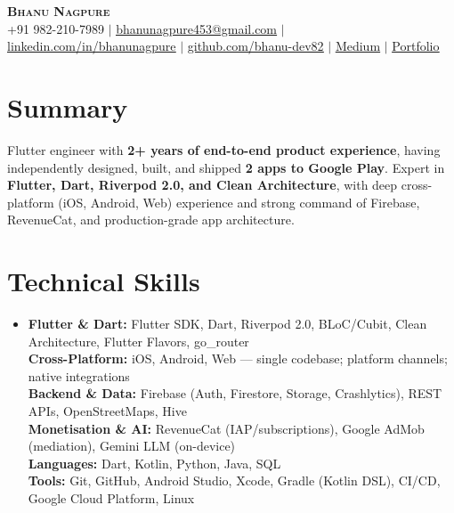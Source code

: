 \documentclass[letterpaper,10pt]{article}
\newcommand{\resumeSubHeadingListStart}{\begin{itemize}[leftmargin=0.13in, label={}]}
\newcommand{\resumeSubHeadingListEnd}{\end{itemize}}
\begin{document}
\begin{center}
    {\LARGE\bfseries\scshape Bhanu Nagpure} \\ \vspace{3pt}
    \small +91 982-210-7989 $|$
    \href{mailto:bhanunagpure453@gmail.com}{\underline{bhanunagpure453@gmail.com}} $|$
    \href{https://www.linkedin.com/in/bhanunagpure/}{\underline{linkedin.com/in/bhanunagpure}} $|$
    \href{https://github.com/bhanu-dev82}{\underline{github.com/bhanu-dev82}} $|$
    \href{https://medium.com/@bhanu.r.nagpure.8082}{\underline{Medium}} $|$
    \href{https://bhanu-dev82.github.io}{\underline{Portfolio}}
\end{center}

\vspace{-4pt}

\section{Summary}
\small{
Flutter engineer with \textbf{2+ years of end-to-end product experience}, having independently designed, built, and shipped \textbf{2 apps to Google Play}. Expert in \textbf{Flutter, Dart, Riverpod 2.0, and Clean Architecture}, with deep cross-platform (iOS, Android, Web) experience and strong command of Firebase, RevenueCat, and production-grade app architecture.
}
\vspace{-4pt}

\section{Technical Skills}
\resumeSubHeadingListStart
  \item\small{
    \textbf{Flutter \& Dart:} Flutter SDK, Dart, Riverpod 2.0, BLoC/Cubit, Clean Architecture, Flutter Flavors, go\_router \\[1pt]
    \textbf{Cross-Platform:} iOS, Android, Web — single codebase; platform channels; native integrations \\[1pt]
    \textbf{Backend \& Data:} Firebase (Auth, Firestore, Storage, Crashlytics), REST APIs, OpenStreetMaps, Hive \\[1pt]
    \textbf{Monetisation \& AI:} RevenueCat (IAP/subscriptions), Google AdMob (mediation), Gemini LLM (on-device) \\[1pt]
    \textbf{Languages:} Dart, Kotlin, Python, Java, SQL \\[1pt]
    \textbf{Tools:} Git, GitHub, Android Studio, Xcode, Gradle (Kotlin DSL), CI/CD, Google Cloud Platform, Linux
  }
\resumeSubHeadingListEnd
\vspace{-2pt}
\end{document}

